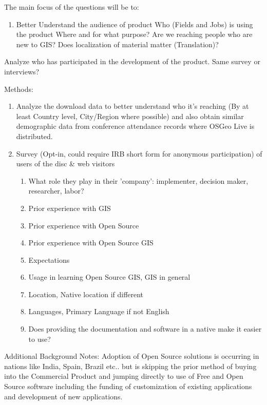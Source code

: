 \documentclass[12pt,letterpaper]{article}
\begin{document}
The main focus of the questions will be to:
\begin{enumerate}
\item Better Understand the audience of product
	Who (Fields and Jobs) is using the product Where and for what purpose?
	Are we reaching people who are new to GIS?
	Does localization of material matter (Translation)?	

\end{enumerate}
		
Analyze who has participated in the development of the product. Same survey or interviews?	
	
Methods:
\begin{enumerate}
\item Analyze the download data to better understand who it's reaching (By at least Country level, City/Region where possible) and also obtain similar demographic data from conference attendance records where OSGeo Live is distributed.
\item Survey (Opt-in, could require IRB short form for anonymous participation) of users of the disc \& web visitors
	\begin{enumerate}
		\item What role they play in their 'company': implementer, decision maker, researcher, labor?
		\item Prior experience with GIS
		\item Prior experience with Open Source
		\item Prior experience with Open Source GIS
		\item Expectations
		\item Usage in learning Open Source GIS, GIS in general
		\item Location, Native location if different
		\item Languages, Primary Language if not English
		\item Does providing the documentation and software in a native make it easier to use?
	\end{enumerate}
\end{enumerate}

Additional Background Notes: Adoption of Open Source solutions is occurring in nations like India, Spain, Brazil etc.. but is skipping the prior method of buying into the Commercial Product and jumping directly to use of Free and Open Source software including the funding of customization of existing applications and development of new applications.
\end{document}
